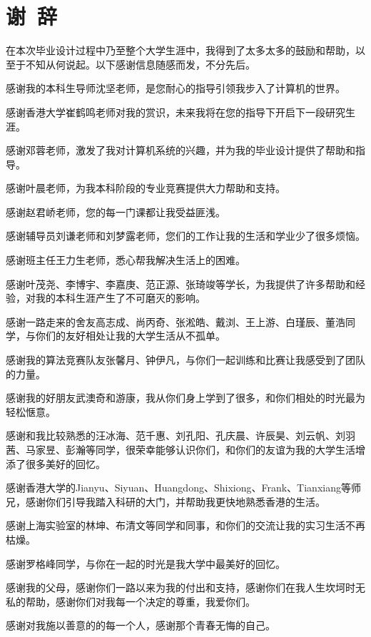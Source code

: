 \section*{谢\ 辞}

在本次毕业设计过程中乃至整个大学生涯中，我得到了太多太多的鼓励和帮助，以至于不知从何说起。以下感谢信息随感而发，不分先后。

感谢我的本科生导师沈坚老师，是您耐心的指导引领我步入了计算机的世界。

感谢香港大学崔鹤鸣老师对我的赏识，未来我将在您的指导下开启下一段研究生涯。

感谢邓蓉老师，激发了我对计算机系统的兴趣，并为我的毕业设计提供了帮助和指导。

感谢叶晨老师，为我本科阶段的专业竞赛提供大力帮助和支持。

感谢赵君峤老师，您的每一门课都让我受益匪浅。

感谢辅导员刘谦老师和刘梦露老师，您们的工作让我的生活和学业少了很多烦恼。

感谢班主任王力生老师，悉心帮我解决生活上的困难。

感谢叶茂尧、李博宇、李嘉庚、范正源、张琦竣等学长，为我提供了许多帮助和经验，对我的本科生涯产生了不可磨灭的影响。

感谢一路走来的舍友高志成、尚丙奇、张淞皓、戴浏、王上游、白瑾辰、董浩同学，与你们的友好相处让我的大学生活从不孤单。

感谢我的算法竞赛队友张馨月、钟伊凡，与你们一起训练和比赛让我感受到了团队的力量。

感谢我的好朋友武澳奇和游康，我从你们身上学到了很多，和你们相处的时光最为轻松惬意。

感谢和我比较熟悉的汪冰海、范千惠、刘孔阳、孔庆晨、许辰昊、刘云帆、刘羽茜、马家昱、彭瀚等同学，很荣幸能够认识你们，和你们的友谊为我的大学生活增添了很多美好的回忆。

感谢香港大学的Jianyu、Siyuan、Huangdong、Shixiong、Frank、Tianxiang等师兄，感谢你们引导我踏入科研的大门，并帮助我更快地熟悉香港的生活。

感谢上海实验室的林坤、布清文等同学和同事，和你们的交流让我的实习生活不再枯燥。

感谢罗格峰同学，与你在一起的时光是我大学中最美好的回忆。

感谢我的父母，感谢你们一路以来为我的付出和支持，感谢你们在我人生坎坷时无私的帮助，感谢你们对我每一个决定的尊重，我爱你们。

感谢对我施以善意的的每一个人，感谢那个青春无悔的自己。
